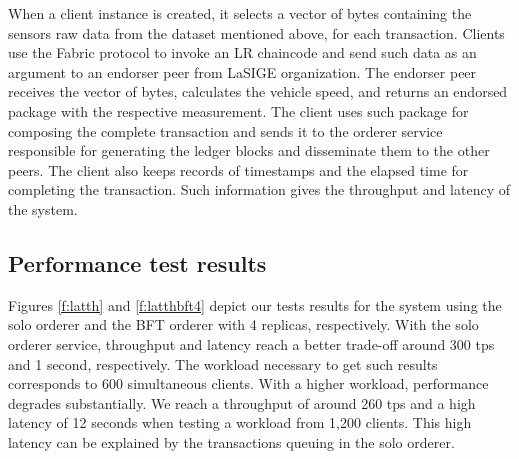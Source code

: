 \documentclass[journal]{IEEEtran}
\begin{document}
When a client instance is created, it selects a vector of bytes containing the sensors raw data from the dataset mentioned above, for each transaction.
Clients use the Fabric protocol to invoke an LR chaincode and send such data as an argument to an endorser peer from LaSIGE organization.
The endorser peer receives the vector of bytes, calculates the vehicle speed, and returns an endorsed package with the respective measurement.
The client uses such package for composing the complete transaction and sends it to the orderer service responsible for generating the ledger blocks and disseminate them to the other peers.
The client also keeps records of timestamps and the elapsed time for completing the transaction.
Such information gives the throughput and latency of the system. %



\subsection{Performance test results}
Figures \ref{f:latth} and \ref{f:latthbft4} depict our tests results for the system using the solo orderer and the BFT orderer with 4 replicas, respectively.
With the solo orderer service, throughput and latency reach a better trade-off around 300 tps and 1 second, respectively.
The workload necessary to get such results corresponds to 600 simultaneous clients.
With a higher workload, performance degrades substantially.
We reach a throughput of around 260 tps and a high latency of 12 seconds when testing a workload from 1,200 clients.
This high latency can be explained by the transactions queuing in the solo orderer.
\end{document}
